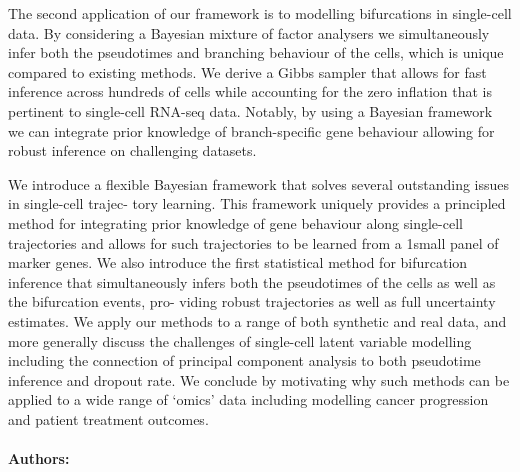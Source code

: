 The second application of our framework is to modelling bifurcations in single-cell data. By
considering a Bayesian mixture of factor analysers we simultaneously infer both the pseudotimes and
branching behaviour of the cells, which is unique compared to existing methods. We derive a Gibbs
sampler that allows for fast inference across hundreds of cells while accounting for the zero inflation
that is pertinent to single-cell RNA-seq data. Notably, by using a Bayesian framework we can integrate
prior knowledge of branch-specific gene behaviour allowing for robust inference on challenging datasets.

We introduce a flexible Bayesian framework that solves several outstanding issues in single-cell trajec-
tory learning. This framework uniquely provides a principled method for integrating prior knowledge
of gene behaviour along single-cell trajectories and allows for such trajectories to be learned from a
1small panel of marker genes. We also introduce the first statistical method for bifurcation inference
that simultaneously infers both the pseudotimes of the cells as well as the bifurcation events, pro-
viding robust trajectories as well as full uncertainty estimates. We apply our methods to a range of
both synthetic and real data, and more generally discuss the challenges of single-cell latent variable
modelling including the connection of principal component analysis to both pseudotime inference and
dropout rate. We conclude by motivating why such methods can be applied to a wide range of ‘omics’
data including modelling cancer progression and patient treatment outcomes.

\noindent \paragraph{Authors:} 

